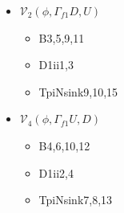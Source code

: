 \documentclass{article}[12pt]
\begin{document}
\begin{itemize}
\begin{itemize}
\item B13,14,17,18
\item D1ii13,14
\item TpiNsink19,20,23
\end{itemize}
\item ${\mathcal V}_2\left(\phi, \Gamma_{f1}D, U\right)$
\begin{itemize}
\item B3,5,9,11
\item D1ii1,3
\item TpiNsink9,10,15
\end{itemize}
\item ${\mathcal V}_4\left(\phi, \Gamma_{f1}U, D\right)$
\begin{itemize}
\item B4,6,10,12
\item D1ii2,4
\item TpiNsink7,8,13
\end{itemize}
\end{itemize}
\end{document}
